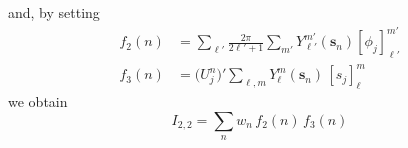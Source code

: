 \documentclass[12pt,letterpaper,oneside]{article}
\theoremstyle{definition}
\begin{document}
and, by setting
\begin{align*}
f_2(n) & = \sum_{\ell'} \frac{2\pi}{2 \ell'+1} \sum_{m'} Y_{\ell'}^{m'}(\boldsymbol{s}_n) [\phi_j]_{\ell '}^{m '}  \\
f_3(n) & = \big( U_j^n \big)' \sum_{\ell,m} Y_\ell^m(\boldsymbol{s}_n) \, [s_j]_\ell^m
\end{align*}
we obtain
\[
I_{2,2} = \sum_n w_n \, f_2(n) \, f_3(n)
\]

\end{document}
